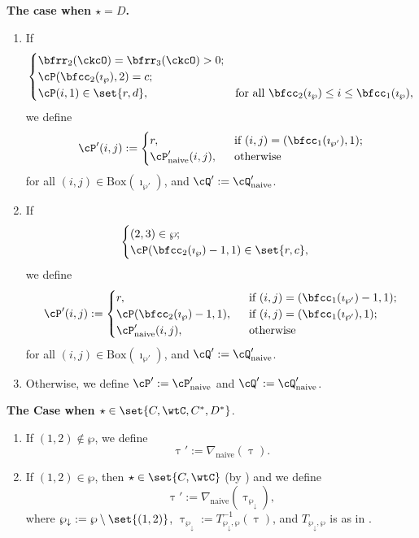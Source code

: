 \documentclass[12pt]{amsart}
\numberwithin{equation}{section}
\theoremstyle{remark}
\def\BOX#1{\mathrm{Box}(#1)}
\def\AND{\quad \text{and} \quad}
\def\wpm{\wp_{\downarrow}}
\def\tnaive{\mathrm{naive}}
\def\imathwpp{\imath_{\wp'}}
\def\cPpn{\cP'_\mathrm{naive}}
\def\cQpn{\cQ'_\mathrm{naive}}
\def\alphapn{\alpha'_{\tnaive}}
\def\DDn{\nabla_{\tnaive}}
\begin{document}
\medskip
{\bfseries The case when $\star = D$. }
\begin{enumerate}[label=(\alph*),wide=0pt]
  \item If
  \[
    \begin{cases}
      \bfrr_2(\ckcO)=\bfrr_{3}(\ckcO)>0; & \\
      \cP(\bfcc_{2}(\imath_{\wp}),2) = c;  &\\
      \cP(i,1)\in \set{r,d}, & \text{for all
        $\bfcc_{2}(\imath_{\wp})\leq i\leq \bfcc_{1}(\imath_{\wp})$},
    \end{cases}
  \]
  we define %
  \[
    \cP'(i,j) := \begin{cases}
      r, & \ \text{ if $(i,j) = (\bfcc_1(\imathwpp),1)$;}\\
      \cPpn(i,j), & \ \text{ otherwise}
    \end{cases}
  \] for all $(i,j)\in \BOX{\imathwpp}$, and
  $\cQ' := \cQpn $.
  \item If
  \[
    \begin{cases}
      (2,3)\in \wp ;& \\
      \cP(\bfcc_2(\imath_{\wp})-1,1)\in \set{r,c},
    \end{cases}
  \]
  we define
  \[
    \cP'(i,j) := \begin{cases}
      r, & \ \text{ if $(i,j) = (\bfcc_1(\imathwpp)-1,1)$;}\\
      \cP(\bfcc_2(\imath_{\wp})-1,1), & \ \text{ if $(i,j) = (\bfcc_1(\imathwpp),1)$;}\\
      \cPpn(i,j), & \ \text{ otherwise}
    \end{cases}
  \] for all $(i,j)\in \BOX{\imathwpp}$,  and
  $\cQ' := \cQpn $.
  \item Otherwise, we define $\cP' := \cPpn$ and $\cQ':= \cQpn$.
\end{enumerate}

\medskip

{\bfseries The Case when $\star \in \set{C,\wtC,C^{*},D^{*}}$}.
\begin{enumerate}[label=(\alph*),wide=0pt]
  \item If $(1,2)\notin \wp$, we define
  \[
    \uptau' := \DDn(\uptau).
  \]
  \item If $(1,2)\in \wp$, then $\star \in \set{C,\wtC}$ (by ) and we define
  \[
  \uptau' := \DDn(\uptau_{\wpm}),
  \]
  where $\wpm := \wp \setminus \set{(1,2)}$,
  $\uptau_{\wpm}:= T_{\wpm,\wp}^{-1}(\uptau)$,
  and $T_{\wpm,\wp}$ is as in .
 \end{enumerate}
\end{document}
